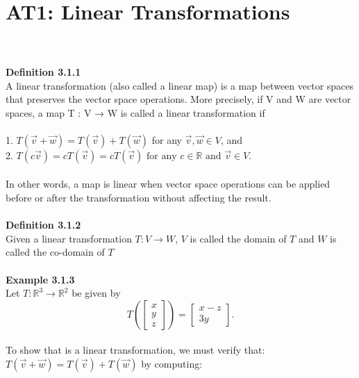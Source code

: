 \documentclass{article}
\begin{document}
\\
\tableofcontents
\newpage
\section{AT1: Linear Transformations}\\
\\
\textbf{Definition 3.1.1} \\
A linear transformation (also called a linear map) is a
map between vector spaces that preserves the vector space operations. More
precisely, if V and W are vector spaces, a map T : V → W is called a linear
transformation if\\
\\
1. $T(\vec{v}+\vec{w}) = T(\vec{v})+T(\vec{w})$ for any $\vec{v},\vec{w} \in V$, and\\
2. $T(c\vec{v}) = cT(\vec{v}) = cT(\vec{v}) \text{ for any } c \in \mathbb{R}\text{  and } \vec{v} \in V$.\\
\\
In other words, a map is linear when vector space operations can be applied
before or after the transformation without affecting the result. \\
\\
\textbf{Definition 3.1.2}\\ Given a linear transformation $T:V\to W$, $V$ is called the domain of $T$ and $W$ is called the co-domain of $T$\\
\\
\textbf{Example 3.1.3}\\
Let $T : \mathbb{R}^{3} \rightarrow \mathbb{R}^{2}$ be given by \begin{equation*}
T\left(\left[\begin{array}{c} x \\ y \\ z \end{array}\right] \right)
=
\left[\begin{array}{c} x-z \\ 3y \end{array}\right].
\end{equation*}\\
To show that is a linear transformation, we must verify that: $T(\vec{v}+\vec{w}) = T(\vec{v})+T(\vec{w})$ by computing:\\
\end{document}
